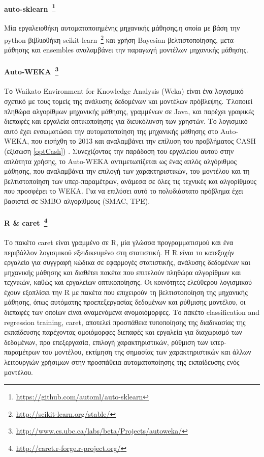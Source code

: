  \paragraph[auto-sklearn]{auto-sklearn~\footnote{\url{https://github.com/automl/auto-sklearn}} } Μία εργαλειοθήκη αυτοματοποιημένης μηχανικής μάθησης,η οποία με βάση την python βιβλιοθήκη scikit-learn~\footnote{\url{http://scikit-learn.org/stable/}} και χρήση Bayesian βελτιστοποίησης, μετα-μάθησης και ensembles αναλαμβάνει την παραγωγή μοντέλων μηχανικής μάθησης.
 
    
 \paragraph[Auto-WEKA]{Auto-WEKA~\footnote{\url{http://www.cs.ubc.ca/labs/beta/Projects/autoweka/}} }  Το Waikato Environment for Knowledge Analysis (Weka) είναι ένα λογισμικό σχετικό με τους τομείς της ανάλυσης δεδομένων και μοντέλων πρόβλεψης. Υλοποιεί πληθώρα αλγορίθμων μηχανικής μάθησης, γραμμένων σε Java, και παρέχει γραφικές διεπαφές και εργαλεία οπτικοποίησης για διευκόλυνση των χρηστών. Το λογισμικό αυτό έχει ενσωματώσει την αυτοματοποίηση της μηχανικής μάθησης στο Auto-WEKA, που εισήχθη το 2013 \citep{DBLP:journals/corr/abs-1208-3719} και αναλαμβάνει την επίλυση του προβλήματος  CASH (εξίσωση \ref{optCash}) . Συνεχίζοντας την παράδοση του εργαλείου αυτού στην απλότητα χρήσης, το Auto-WEKA αντιμετωπίζεται ως ένας απλός αλγόριθμος μάθησης, που αναλαμβάνει την επιλογή των χαρακτηριστικών, του μοντέλου και  τη βελτιστοποίηση των υπερ-παραμέτρων, ανάμεσα σε όλες τις τεχνικές και αλγορίθμους που προσφέρει το WEKA. Για να επιλύσει αυτό το πολυδιάστατο πρόβλημα έχει βασιστεί σε SMBO αλγορίθμους (SMAC, TPE).  
 \paragraph[caret]{R \& caret~\footnote{\url{http://caret.r-forge.r-project.org/}} }  Το πακέτο caret είναι γραμμένο σε R, μία γλώσσα προγραμματισμού και ένα περιβάλλον λογισμικού εξειδικευμένο στη στατιστική. Η R είναι το κατεξοχήν εργαλείο για συγγραφή κώδικα σε εφαρμογές στατιστικής, ανάλυσης δεδομένων και μηχανικής μάθησης και  διαθέτει πακέτα που επιτελούν πληθώρα αλγορίθμων και τεχνικών, καθώς και εργαλείων οπτικοποίησης. Οι κοινότητες ελεύθερου λογισμικού έχουν εξοπλίσει την R με πακέτα που επιχειρούν τη βελτιστοποίηση της μηχανικής μάθησης, όπως αυτόματης προεπεξεργασίας δεδομένων και  ρύθμισης μοντέλου, οι διεπαφές των οποίων είναι αναμενόμενα ανομοιόμορφες.  Το πακέτο classification and regression training, caret, αποτελεί προσπάθεια τυποποίησης της διαδικασίας της εκπαίδευσης παρέχοντας ομοιόμορφες διεπαφές και  εργαλεία για διαχωρισμό των δεδομένων, προ επεξεργασία, επιλογή χαρακτηριστικών, ρύθμιση των υπερ-παραμέτρων του μοντέλου, εκτίμηση της σημασίας των χαρακτηριστικών και άλλων λειτουργιών χρήσιμων στην προσπάθεια αυτοματοποίησης της εκπαίδευσης ενός μοντέλου.

